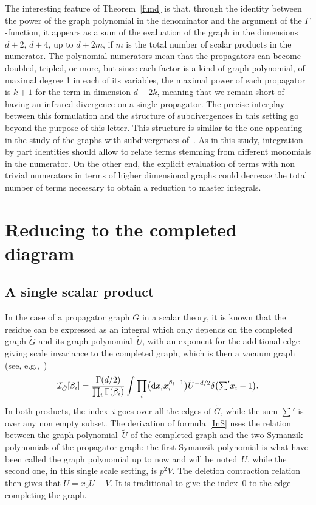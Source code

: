 \documentclass[pdftex]{sigma}
\numberwithin{equation}{section}
\def\cI{{\mathcal I}}
\begin{document}
The interesting feature of Theorem~\ref{fund} is that, through the identity between the power of the graph
polynomial in the denominator and the argument of the $\Gamma$-function, it appears as a sum of the
evaluation of the graph in the dimensions $d+2$, $d+4$, up to $d+2m$, if $m$ is the total number of
scalar products in the numerator. The polynomial numerators mean that the propagators can become doubled,
tripled, or more, but since each factor is a kind of graph polynomial, of maximal degree 1 in each of its
variables, the maximal power of each propagator is $k+1$ for the term in dimension $d+2k$, meaning that we remain short of
having an infrared divergence on a single propagator. The precise interplay between this formulation and the structure of
subdivergences in this setting go beyond the purpose of this letter. This structure is similar to the one
appearing in the study of the graphs with subdivergences of~\cite{MaPaSch14}. As in this study, integration by part
identities should allow to relate terms stemming from different monomials in the numerator. On the other end, the explicit evaluation of terms with non trivial numerators in terms of higher dimensional graphs could decrease the total number of terms necessary to obtain a reduction to master integrals.

\section{Reducing to the completed diagram}
\subsection{A single scalar product}

In the case of a propagator graph $G$ in a scalar theory, it is known that the residue can be expressed as an integral which
only depends on the completed graph $\tilde G$ and its graph polynomial~$\tilde U$, with an exponent
for the additional edge giving scale invariance to the completed graph, which is then a vacuum graph (see, e.g.,~\cite{Sch10})
\begin{equation} \label{InS}
	\cI_{\tilde G} [\beta_i] = \frac {\Gamma(d/2)} {\prod_i \Gamma(\beta_i)}
			\int \prod_i \bigl( {\rm d}x_i^{\vphantom {\beta_i}} x_i^{\beta_i-1}\bigr)
			\tilde U^{-d/2} \delta \bigl(\textstyle{ \sum' }x_i -1\bigr).
\end{equation}
In both products, the index~$i$ goes over all the edges of $\tilde G$, while the sum $\sum'$ is over any non
empty subset.
The derivation of formula~\eqref{InS} uses the relation between the graph polynomial~$\tilde U$ of the completed
graph and the two Symanzik polynomials of the propagator graph: the first Symanzik polynomial is what have been called the graph
polynomial up to now and will be noted~$U$, while the second one, in this single scale setting, is $p^2 V$. The
deletion contraction relation then gives that $\tilde U = x_0 U + V$. It is traditional to give the
index~0 to the edge completing the graph.
\end{document}
